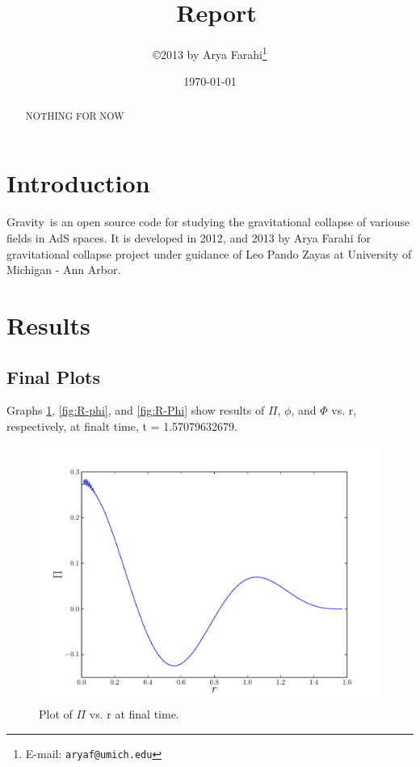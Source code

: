 \documentclass[12pt]{article}
\title{\grv\ Report}
\author{\copyright 2013 by Arya Farahi\thanks{E-mail: {\tt aryaf@umich.edu}}}
\date{\today}
\def\grv{{\sc Gravity}}
\begin{document}
\maketitle

\begin{abstract}
NOTHING FOR NOW
\end{abstract}


\section{Introduction}

\grv\ is an open source code for studying the gravitational collapse of variouse fields in AdS spaces. It is developed in 2012, and 2013 by Arya Farahi for gravitational collapse project under guidance of Leo Pando Zayas at University of Michigan - Ann Arbor. 
\section{Results}
\subsection{Final Plots}

Graphs \ref{fig:R-Pi}, \ref{fig:R-phi}, and \ref{fig:R-Phi} show results of $\Pi$, $\phi$, and $\Phi$ vs. r, respectively, at finalt time, t =  1.57079632679.

\begin{figure}[hbt]
 \centering
 \includegraphics[width=12cm]{./Report/PivrR.pdf}
 \caption{Plot of $\Pi$ vs. r at final time.}
 \label{fig:R-Pi}
\end{figure}
\end{document}
